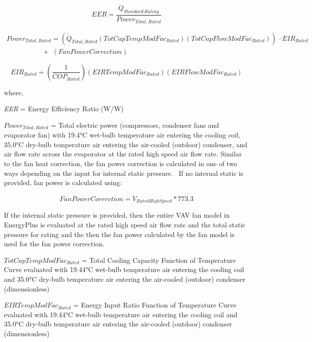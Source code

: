 \begin{equation}
  EER = \frac{{\dot Q}_{Standard\,Rating}}{Power_{Total,Rated}}
\end{equation}

\begin{equation}
  \begin{array}{l}
    Power_{Total,Rated} = \left( {\dot Q}_{Total,Rated} (TotCapTempModFac_{Rated})(TotCapFlowModFac_{Rated}) \right)\, \cdot EIR_{Rated} \\
    \,\,\,\,\,\,\,\,\,\,\,\,\,\,\,\,\,\,\,\,\,\,\,\,\,\,\,\,\,\,\, + \,\,\left( FanPowerCorrection \right)
  \end{array}
\end{equation}

\begin{equation}
  EIR_{Rated} = \left( {\frac{1}{{CO{P_{Rated}}}}} \right)(EIRTempModFa{c_{Rated}})(EIRFlowModFa{c_{Rated}})
\end{equation}

where,

\emph{EER} = Energy Efficiency Ratio (W/W)

\(Power_{Total,Rated}\) = Total electric power (compressors, condenser fans and evaporator fan) with 19.4°C wet-bulb temperature air entering the cooling coil, 35.0°C dry-bulb temperature air entering the air-cooled (outdoor) condenser, and air flow rate across the evaporator at the rated high speed air flow rate. Similar to the fan heat correction, the fan power correction is calculated in one of two ways depending on the input for internal static pressure.~ If no internal static is provided, fan power is calculated using:

\begin{equation}
  FanPowerCorrection = {\dot V_{RatedHighSpeed}} * 773.3
\end{equation}

If the internal static pressure is provided, then the entire VAV fan model in EnergyPlus is evaluated at the rated high speed air flow rate and the total static pressure for rating and the then the fan power calculated by the fan model is used for the fan power correction.

\(TotCapTempModFac_{Rated}\) = Total Cooling Capacity Function of Temperature Curve evaluated with 19.44°C wet-bulb temperature air entering the cooling coil and 35.0°C dry-bulb temperature air entering the air-cooled (outdoor) condenser (dimensionless)

\(EIRTempModFa{c_{Rated}}\) = Energy Input Ratio Function of Temperature Curve evaluated with 19.44°C wet-bulb temperature air entering the cooling coil and 35.0°C dry-bulb temperature air entering the air-cooled (outdoor) condenser (dimensionless)

